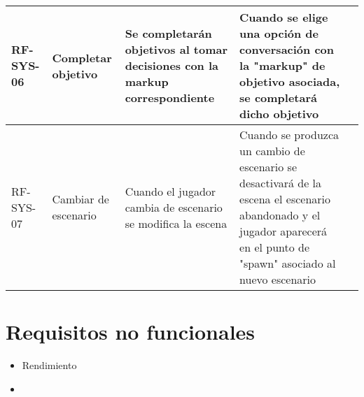 \begin{table}[]
\begin{tabular}{|l|l|l|l|l|}
RF-SYS-06     & Completar objetivo            & Se completarán objetivos al tomar decisiones con la markup correspondiente              & Cuando se elige una opción de conversación con la "markup" de objetivo asociada, se completará dicho objetivo                                                                                                                                                         &                \\ \hline
RF-SYS-07     & Cambiar de escenario          & Cuando el jugador cambia de escenario se modifica la escena                             & Cuando se produzca un cambio de escenario se desactivará de la escena el escenario abandonado y el jugador aparecerá en el punto de "spawn" asociado al nuevo escenario                                                                                               &                \\ \hline
\end{tabular}
\end{table}


\section{Requisitos no funcionales}


\begin{itemize}

\item Rendimiento
\item 

\end{itemize}